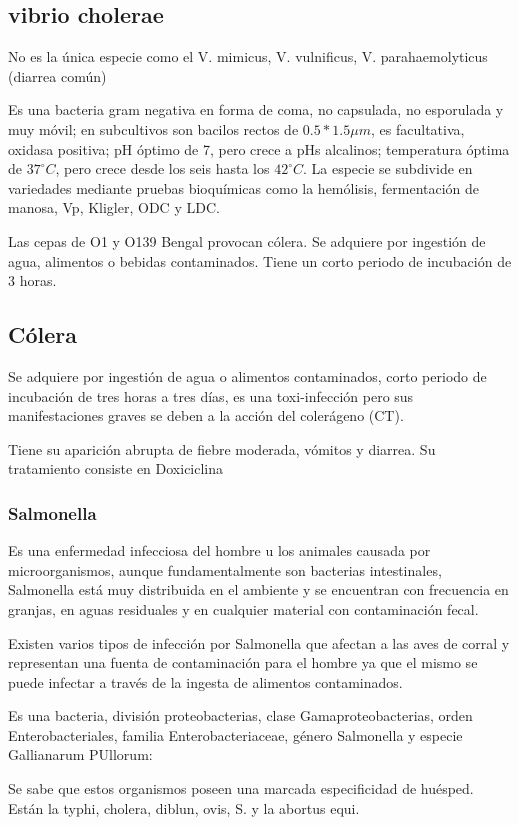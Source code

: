 \subsection{vibrio cholerae}
No es la única especie como el V. mimicus, V. vulnificus, V. parahaemolyticus (diarrea común)

Es una bacteria gram negativa en forma de coma, no capsulada, no esporulada y muy móvil; en subcultivos son bacilos rectos de $0.5*1.5\mu m$, es facultativa, oxidasa positiva; pH óptimo de 7, pero crece a pHs alcalinos; temperatura óptima de $37^{\circ}C$, pero crece desde los seis hasta los $42^{\circ}C$. La especie se subdivide en variedades mediante pruebas bioquímicas como la hemólisis, fermentación de manosa, Vp, Kligler, ODC y LDC.

Las cepas de O1 y O139 Bengal provocan cólera. Se adquiere por ingestión de agua, alimentos o bebidas contaminados. Tiene un corto periodo de incubación de 3 horas.
\subsection{Cólera}
Se adquiere por ingestión de agua o alimentos contaminados, corto periodo de incubación de tres horas a tres días, es una toxi-infección pero sus manifestaciones graves se deben a la acción del colerágeno (CT).

Tiene su aparición abrupta de fiebre moderada, vómitos y diarrea. Su tratamiento consiste en Doxiciclina

\subsubsection{Salmonella}
Es una enfermedad infecciosa del hombre u los animales causada por microorganismos, aunque fundamentalmente son bacterias intestinales, Salmonella está muy distribuida en el ambiente y se encuentran con frecuencia en granjas, en aguas residuales y en cualquier material con contaminación fecal.

Existen varios tipos de infección por Salmonella que afectan a las aves de corral y representan una fuenta de contaminación para el hombre ya que el mismo se puede infectar a través de la ingesta de alimentos contaminados.

Es una bacteria, división proteobacterias, clase Gamaproteobacterias, orden Enterobacteriales, familia Enterobacteriaceae, género Salmonella y especie Gallianarum PUllorum:

Se sabe que estos organismos poseen una marcada especificidad de huésped. Están la typhi, cholera, diblun, ovis, S. y la abortus equi.

